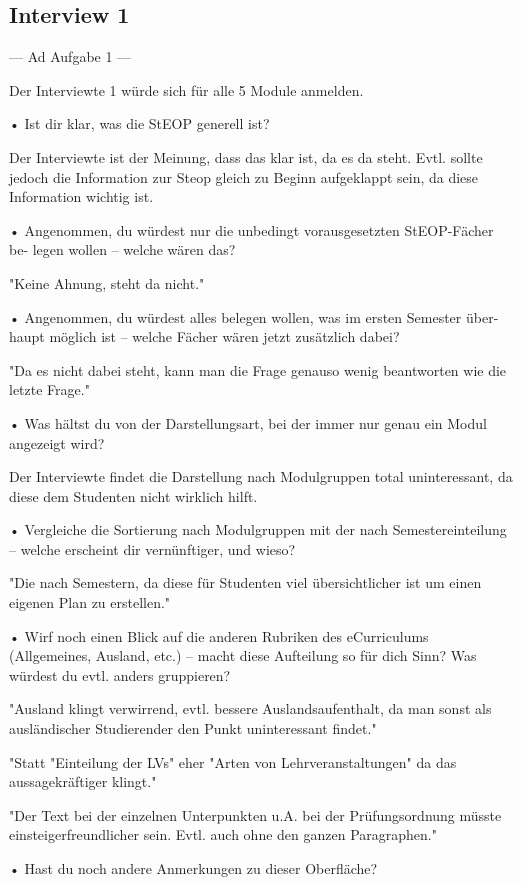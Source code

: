 \documentclass[a4paper,10pt]{scrartcl}
\begin{document}
\subsection{Interview 1}

---
Ad Aufgabe 1
---

Der Interviewte 1 würde sich für alle 5 Module anmelden.

• Ist dir klar, was die StEOP generell ist?

Der Interviewte ist der Meinung, dass das klar ist, da es da steht. Evtl. sollte jedoch die Information zur Steop gleich zu Beginn aufgeklappt sein, da diese Information wichtig ist.


• Angenommen, du würdest nur die unbedingt vorausgesetzten StEOP-Fächer be-
legen wollen – welche wären das?

"Keine Ahnung, steht da nicht."


• Angenommen, du würdest alles belegen wollen, was im ersten Semester über-
haupt möglich ist – welche Fächer wären jetzt zusätzlich dabei?

"Da es nicht dabei steht, kann man die Frage genauso wenig beantworten wie die letzte Frage."


• Was hältst du von der Darstellungsart, bei der immer nur genau ein Modul
angezeigt wird?

Der Interviewte findet die Darstellung nach Modulgruppen total uninteressant, da diese dem Studenten nicht wirklich hilft.

• Vergleiche die Sortierung nach Modulgruppen mit der nach Semestereinteilung
– welche erscheint dir vernünftiger, und wieso?

"Die nach Semestern, da diese für Studenten viel übersichtlicher ist um einen eigenen Plan zu erstellen."


• Wirf noch einen Blick auf die anderen Rubriken des eCurriculums (Allgemeines,
Ausland, etc.) – macht diese Aufteilung so für dich Sinn? Was würdest du evtl.
anders gruppieren?

"Ausland klingt verwirrend, evtl. bessere Auslandsaufenthalt, da man sonst als ausländischer Studierender den Punkt uninteressant findet."

"Statt "Einteilung der LVs" eher "Arten von Lehrveranstaltungen" da das aussagekräftiger klingt."

"Der Text bei der einzelnen Unterpunkten u.A. bei der Prüfungsordnung müsste einsteigerfreundlicher sein. Evtl. auch ohne den ganzen Paragraphen."


• Hast du noch andere Anmerkungen zu dieser Oberfläche?
\end{document}
